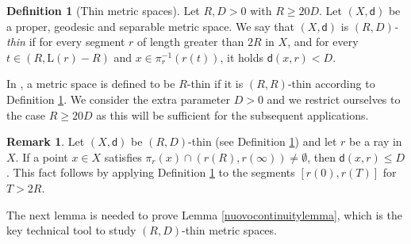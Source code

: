 \documentclass[10pt]{article}
\theoremstyle{definition}
\newtheorem{definition}[thm]{Definition}
\newtheorem{remark}[thm]{Remark}
\newcommand{\length}{\mathrm{L}}
\newcommand{\sd}{\mathsf{d}}
\begin{document}
\begin{definition}[Thin metric spaces]\label{Condition}
Let $R,D>0$ with $R \geq 20D$. Let $(X,\sd)$ be a proper, geodesic and separable metric space. We say that $(X,\sd)$ is \emph{$(R,D)$-thin} if for every segment $r$ of length greater than $2R$ in $X$, and for every $t \in (R,\length(r)-R)$ and $x \in \pi_r^{-1}(r(t))$, it holds $\sd(x,r) < D$.
\end{definition}

In \cite{TrianglesKapo}, a metric space is defined to be $R$-thin if it is $(R,R)$-thin according to Definition \ref{Condition}. We consider the extra parameter $D>0$ and we restrict ourselves to the case $R \geq 20D$ as this will be sufficient for the subsequent applications.



\begin{remark} \label{R1}
Let $(X,\sd)$ be $(R,D)$-thin (see Definition \ref{Condition}) and
    let $r$ be a ray in $X$.
    If a point $x \in X$ satisfies $\pi_r(x) \cap (r(R),r(\infty)) \neq \emptyset$, then $\sd(x,r) \leq D$.
    This fact follows by applying Definition \ref{Condition} to the segments $[r(0),r(T)]$ for $T>2R$.
\end{remark}

 The next lemma is needed to prove Lemma \ref{nuovocontinuitylemma}, which is the key technical tool to study $(R,D)$-thin metric spaces.
 
\end{document}
